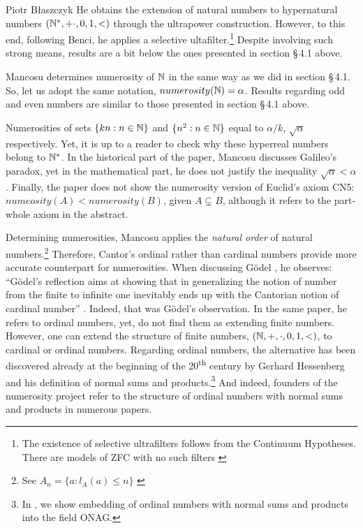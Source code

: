 \begin{artengenv}{Piotr Błaszczyk}
He obtains the extension of natural numbers to hypernatural numbers \mbox{$({\mathbb{N}}^*,+\cdot,0,1,<)$} through the ultrapower construction. However, to this end,  following Benci, he applies a selective ultafilter.\footnote{The existence of selective ultrafilters follows from the Continuum Hypotheses. There are models of ZFC with no such filters \parencite[see][76]{ref_tj}} 
Despite involving such strong means, results are a bit below the ones presented in section \S\,4.1 above. 


Mancosu determines numerosity of ${\mathbb{N}}$ in the same way as we did in section \S\,4.1. So, let us adopt the same notation, $numerosity({\mathbb{N}})=\alpha$. Results regarding odd and even numbers are similar to those presented in section \S\,4.1 above. 
 
 Numerosities of sets $\{kn:n\in{\mathbb{N}}\}$ and $\{n^2:n\in{\mathbb{N}}\}$ equal  to  $\alpha/k$, $\sqrt{\alpha}$ respectively. Yet,  it is up to a reader to check why these hyperreal numbers belong to ${\mathbb{N}}^*$.  In the historical part of the paper, Mancosu discusses Galileo's paradox, yet in the mathematical part, he does not justify the inequality $\sqrt{\alpha}<\alpha$.
 Finally, the paper does not show the numerosity version of Euclid's axiom CN5: $numeosity (A)<numerosity(B)$, given $A\subsetneq B$, although it refers to the part-whole axiom
 in the abstract. 
 
 Determining numerosities, Mancosu  applies the \textit{natural order} of natural 
 numbers.\footnote{See $A_n=\{a : l_A(a)\leq n\}$ \parencite[632]{ref_pm09}}
 Therefore, Cantor's ordinal rather than cardinal numbers provide  more accurate counterpart for numerosities. 
When discussing G\"{o}del \parencite*{ref_kg47}, he observes: ``G\"{o}del's reflection aims at showing that in generalizing the notion of number from the finite to infinite one inevitably ends up with the Cantorian notion of cardinal number'' \parencite[638]{ref_pm09}. Indeed, that was G\"{o}del's observation. In the same paper, he refers to ordinal numbers, yet, do not find them as extending finite numbers.  However, one can extend the structure of finite numbers, $({\mathbb{N}},+,\cdot, 0,1,<)$,  to cardinal or ordinal numbers. Regarding ordinal numbers, the alternative has been discovered already at the beginning of the 20\textsuperscript{th} century by Gerhard Hessenberg \parencite*{ref_gh06} and his definition of normal sums and products.\footnote{In \parencite[\S\,8]{ref_bf},  we show embedding of ordinal numbers with normal sums and products into the field ONAG.} And indeed, founders of the numerosity project refer to the structure of ordinal numbers with normal sums and products in numerous papers.
 


\end{artengenv}
